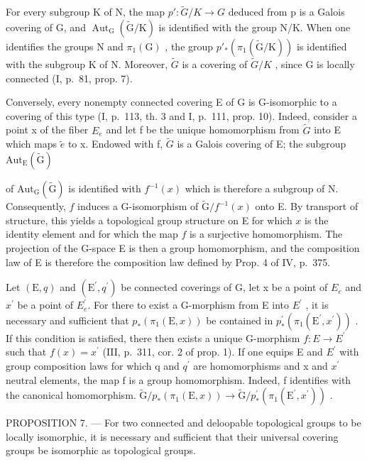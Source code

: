 For every subgroup K of N, the map \(p'\colon\widetilde{G}/K\to G\) deduced from p is a Galois covering of G, and \(\operatorname{Aut}_{\mathrm{G}}(\widetilde{\mathrm{G}}/\mathrm{K})\) is identified with the group N/K. When one identifies the groups N and \(\pi_{1}(\mathrm{G})\) , the group \(p'_{*}(\pi_{1}(\widetilde{\mathrm{G}}/\mathrm{K}))\) is identified with the subgroup K of N. Moreover, \(\widetilde{G}\) is a covering of \(\widetilde{G}/K\) , since G is locally connected (I, p.~81, prop. 7).

Conversely, every nonempty connected covering E of G is G-isomorphic to a covering of this type (I, p.~113, th. 3 and I, p.~111, prop. 10). Indeed, consider a point x of the fiber \(E_{e}\) and let f be the unique homomorphism from \(\widetilde{G}\) into E which maps \(\widetilde{e}\) to x. Endowed with f, \(\widetilde{G}\) is a Galois covering of E; the subgroup \(\mathrm{Aut}_{\mathrm{E}}(\widetilde{\mathrm{G}})\)

of \(\mathrm{Aut}_{\mathrm{G}}(\widetilde{\mathrm{G}})\) is identified with \(f^{-1}(x)\) which is therefore a subgroup of N. Consequently, \(f\) induces a G-isomorphism of \(\widetilde{\mathrm{G}} / f^{-1}(x)\) onto E. By transport of structure, this yields a topological group structure on E for which \(x\) is the identity element and for which the map \(f\) is a surjective homomorphism. The projection of the G-space E is then a group homomorphism, and the composition law of E is therefore the composition law defined by Prop. 4 of IV, p.~375.

Let \((\mathrm{E},q)\) and \((\mathrm{E}^{\prime},q^{\prime})\) be connected coverings of G, let x be a point of \(E_{e}\) and \(x^{\prime}\) be a point of \(E_{e}^{\prime}\). For there to exist a G-morphism from E into \(E^{\prime}\) , it is necessary and sufficient that \(p_{*}(\pi_{1}(\mathrm{E},x))\) be contained in \(p_{*}^{\prime}(\pi_{1}(\mathrm{E}^{\prime},x^{\prime}))\) . If this condition is satisfied, there then exists a unique G-morphism \(f\colon E\to E^{\prime}\) such that \(f(x)=x^{\prime}\) (III, p.~311, cor. 2 of prop. 1). If one equips E and \(E^{\prime}\) with group composition laws for which q and \(q^{\prime}\) are homomorphisms and x and \(x^{\prime}\) neutral elements, the map f is a group homomorphism. Indeed, f identifies with the canonical homomorphism. \(\widetilde{\mathrm{G}}/p_{*}(\pi_{1}(\mathrm{E},x))\to\widetilde{\mathrm{G}}/p_{*}^{\prime}(\pi_{1}(\mathrm{E}^{\prime},x^{\prime}))\) .

PROPOSITION 7. --- For two connected and deloopable topological groups to be locally isomorphic, it is necessary and sufficient that their universal covering groups be isomorphic as topological groups.

